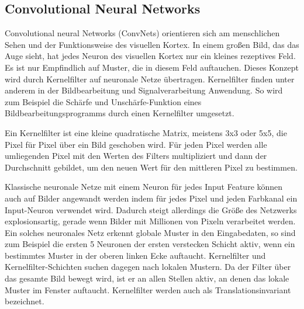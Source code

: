 \subsection{Convolutional Neural Networks}

Convolutional neural Networks (ConvNets) orientieren sich am menschlichen Sehen und der Funktionsweise des visuellen Kortex. In einem großen Bild, das das Auge sieht, hat jedes Neuron des visuellen Kortex nur ein kleines rezeptives Feld. Es ist nur Empfindlich auf Muster, die in diesem Feld auftauchen. Dieses Konzept wird durch Kernelfilter auf neuronale Netze übertragen. Kernelfilter finden unter anderem in der Bildbearbeitung und Signalverarbeitung Anwendung. So wird zum Beispiel die Schärfe und Unschärfe-Funktion eines Bildbearbeitungsprogramms durch einen Kernelfilter umgesetzt. 

Ein Kernelfilter ist eine kleine quadratische Matrix, meistens 3x3 oder 5x5, die Pixel für Pixel über ein Bild geschoben wird. Für jeden Pixel werden alle umliegenden Pixel mit den Werten des Filters multipliziert und dann der Durchschnitt gebildet, um den neuen Wert für den mittleren Pixel zu bestimmen. 

Klassische neuronale Netze mit einem Neuron für jedes Input Feature können auch auf Bilder angewandt werden indem für jedes Pixel und jeden Farbkanal ein Input-Neuron verwendet wird. Dadurch steigt allerdings die Größe des Netzwerks explosionsartig, gerade wenn Bilder mit Millionen von Pixeln verarbeitet werden. Ein solches neuronales Netz erkennt globale Muster in den Eingabedaten, so sind zum Beispiel die ersten 5 Neuronen der ersten verstecken Schicht aktiv, wenn ein bestimmtes Muster in der oberen linken Ecke auftaucht. Kernelfilter und Kernelfilter-Schichten suchen dagegen nach lokalen Mustern. Da der Filter über das gesamte Bild bewegt wird, ist er an allen Stellen aktiv, an denen das lokale Muster im Fenster auftaucht. Kernelfilter werden auch als Translationsinvariant bezeichnet.